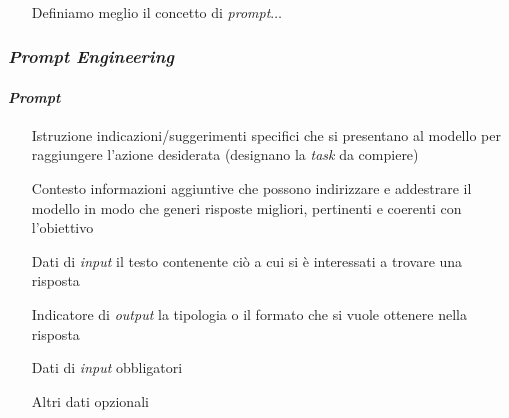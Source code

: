 \begin{frame}[t]
{\begin{minipage}[t]{\textwidth}
\begin{figure}
        \end{figure}
    \end{minipage}
    \\\vspace*{.3cm}
    \begin{minipage}[t]{\textwidth}
        \begin{itemize}[leftmargin=10pt,align=right]
            \item[\alert{\faHandORight}] Definiamo meglio il concetto di \emph{prompt}$\ldots$
        \end{itemize}
    \end{minipage}
}
\end{frame}
%
\begin{frame}[t] \frametitle{\emph{Prompt Engineering}}
\framesubtitle{\emph{Prompt}}
{\scriptsize
{}
    \begin{minipage}[t]{\textwidth}
        \begin{itemize}[leftmargin=50pt,align=right]
            \item[\alert{Istruzione}] indicazioni/suggerimenti specifici che si presentano al modello per raggiungere l'azione desiderata (designano la \emph{task} da compiere)
            \item[\alert{Contesto}] informazioni aggiuntive che possono indirizzare e addestrare il modello in modo che generi risposte migliori, pertinenti e coerenti con l’obiettivo
            \item[\alert{Dati di \emph{input}}] il testo contenente ciò a cui si è interessati a trovare una risposta
            \item[\alert{Indicatore di \emph{output}}] la tipologia o il formato che si vuole ottenere nella risposta
        \end{itemize}
        \vspace*{.5cm}
        \begin{itemize}[leftmargin=10pt,align=right]
            \item[\alert{\faHandORight}] Dati di \emph{input} obbligatori
            \item[\alert{\faHandORight}] Altri dati opzionali
        \end{itemize}
    \end{minipage}
}
\end{frame}
%
